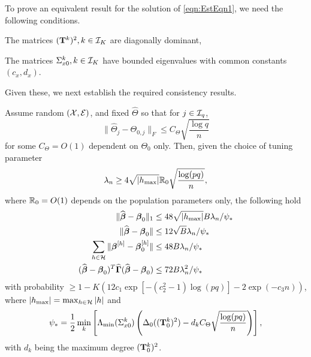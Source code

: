 
To prove an equivalent result for the solution of \eqref{eqn:EstEqn1}, we need the following conditions.

\vspace{1em}
 The matrices $({\mathbf{T}}^k)^2, k \in {\cal{I}}_K$ are diagonally dominant,

 The matrices $\Sigma_{x0}^k, k \in {\cal{I}}_K$ have bounded eigenvalues with common constants $(c_x, d_x)$.
\vspace{1em}
%

\noindent Given these, we next establish the required consistency results.

\begin{theorem}\label{thm:thm-B}
Assume random $({\cal{X}}, {\cal{E}})$, and fixed $\widehat \Theta$ so that for $j \in {\cal{I}}_q$,
%
\[
\| \widehat \Theta_j - \Theta_{0,j} \|_F \leq C_\Theta \sqrt{\frac{\log q}{n}}
\]
%
for some $C_\Theta = O(1)$ dependent on $\Theta_0$ only. Then, given the choice of tuning parameter
%
$$
\lambda_n \geq 4 \sqrt{| h_{\max} |} {\mathbb{R}}_0 \sqrt{ \frac{ \log(pq)}{n}},
$$
%
where ${\mathbb{R}}_0 = O(1)$ depends on the population parameters only, the following hold
%
\begin{align}
\| \widehat {{\boldsymbol{\beta}}} - {\boldsymbol{\beta}}_0 \|_1 & \leq 48 \sqrt{ | h_{\max} |} B \lambda_n / \psi_* \label{eqn:BetaThmEqn1}\\
\| \widehat {{\boldsymbol{\beta}}} - {\boldsymbol{\beta}}_0 \| & \leq 12 \sqrt B \lambda_n / \psi_* \label{eqn:BetaThmEqn2}\\
\sum_{h \in {\cal{H}}} \| {\boldsymbol{\beta}}^{[h]} - {\boldsymbol{\beta}}_0^{[h]} \| & \leq 48 B \lambda_n / \psi_* \label{eqn:BetaThmEqn3}\\
(\widehat {{\boldsymbol{\beta}}} - {\boldsymbol{\beta}}_0 )^T \widehat {{\boldsymbol{\Gamma}}} (\widehat {{\boldsymbol{\beta}}} - {\boldsymbol{\beta}}_0 ) & \leq
72 B \lambda_n^2 / \psi_* \label{eqn:BetaThmEqn4}
\end{align}
%
with probability $\geq 1 - K(12 c_1 \exp[-(c_2^2-1) \log(pq)] - 2 \exp( -c_3 n))$, where $|h_{\max}| = \max_{h \in {\cal{H}}} |h|$ and
%
$$
\psi_*= \frac{1}{2} \min_k \left[ \Lambda_{\min} (\Sigma_{x 0}^k) \left( \Delta_0 ( ({\mathbf{T}}_0^k)^2)
- d_k C_\Theta \sqrt{ \frac{\log (pq)}{n}} \right) \right],
$$
%
with $d_k$ being the maximum degree $({\mathbf{T}}_0^k)^2$.
\end{theorem}

